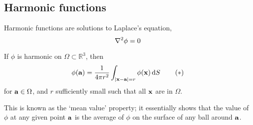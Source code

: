 \subsection{Harmonic functions}
Harmonic functions are solutions to Laplace's equation,
\[
	\laplacian{\phi} = 0
\]
\begin{proposition}
	If \(\phi\) is harmonic on \(\Omega \subset \mathbb R^3\), then
	\begin{equation}
		\phi(\vb a) = \frac{1}{4 \pi r^2} \int_{\abs{\vb x - \vb a} = r} \phi(\vb x) \dd{S}\tag{\(\ast\)}
	\end{equation}
	for \(\vb a \in \Omega\), and \(r\) sufficiently small such that all \(\vb x\) are in \(\Omega\).
\end{proposition}
This is known as the `mean value' property; it essentially shows that the value of \(\phi\) at any given point \(\vb a\) is the average of \(\phi\) on the surface of any ball around \(\vb a\).
